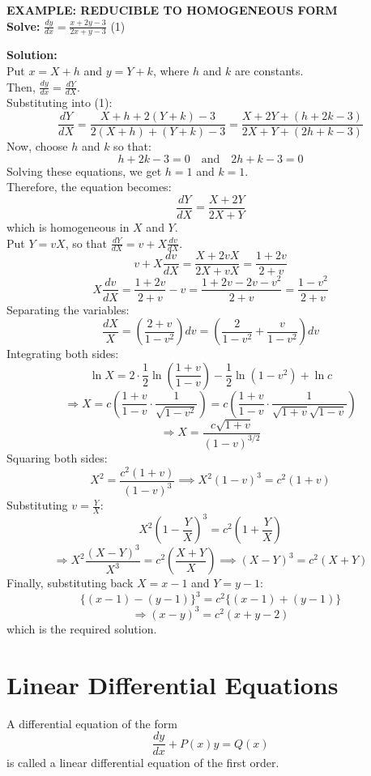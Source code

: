 \documentclass[11pt,a4paper]{article}
\begin{document}
\begin{tcolorbox}[colback=LightBg, colframe=BorderGray, arc=4mm]
    {\small\textbf{\textcolor{AccentBlue}{EXAMPLE: REDUCIBLE TO HOMOGENEOUS FORM}}}
    \vspace{0.2cm}\\
    \textbf{Solve:} $\displaystyle \frac{dy}{dx} = \frac{x+2y-3}{2x+y-3}$ \hfill (1)
    
    \vspace{0.2cm}
    \textbf{Solution:} \\
    Put $x = X+h$ and $y = Y+k$, where $h$ and $k$ are constants. \\
    Then, $\frac{dy}{dx} = \frac{dY}{dX}$. \\
    Substituting into (1):
    \[ \frac{dY}{dX} = \frac{X+h+2(Y+k)-3}{2(X+h)+(Y+k)-3} = \frac{X+2Y + (h+2k-3)}{2X+Y + (2h+k-3)} \]
    Now, choose $h$ and $k$ so that:
    \[ h+2k-3 = 0 \quad \text{and} \quad 2h+k-3 = 0 \]
    Solving these equations, we get $h=1$ and $k=1$. \\
    Therefore, the equation becomes:
    \[ \frac{dY}{dX} = \frac{X+2Y}{2X+Y} \]
    which is homogeneous in $X$ and $Y$. \\
    Put $Y = vX$, so that $\frac{dY}{dX} = v + X\frac{dv}{dX}$.
    \[ v + X\frac{dv}{dX} = \frac{X+2vX}{2X+vX} = \frac{1+2v}{2+v} \]
    \[ X\frac{dv}{dX} = \frac{1+2v}{2+v} - v = \frac{1+2v-2v-v^2}{2+v} = \frac{1-v^2}{2+v} \]
    Separating the variables:
    \[ \frac{dX}{X} = \left(\frac{2+v}{1-v^2}\right)dv = \left(\frac{2}{1-v^2} + \frac{v}{1-v^2}\right)dv \]
    Integrating both sides:
    \[ \ln X = 2 \cdot \frac{1}{2} \ln \left(\frac{1+v}{1-v}\right) - \frac{1}{2} \ln(1-v^2) + \ln c \]
    \[ \Rightarrow X = c \left( \frac{1+v}{1-v} \cdot \frac{1}{\sqrt{1-v^2}} \right) = c \left( \frac{1+v}{1-v} \cdot \frac{1}{\sqrt{1+v}\sqrt{1-v}} \right) \]
    \[ \Rightarrow X = \frac{c\sqrt{1+v}}{(1-v)^{3/2}} \]
    Squaring both sides:
    \[ X^2 = \frac{c^2(1+v)}{(1-v)^3} \implies X^2 (1-v)^3 = c^2 (1+v) \]
    Substituting $v = \frac{Y}{X}$:
    \[ X^2 \left(1 - \frac{Y}{X}\right)^3 = c^2 \left(1 + \frac{Y}{X}\right) \]
    \[ \Rightarrow X^2 \frac{(X-Y)^3}{X^3} = c^2 \left(\frac{X+Y}{X}\right) \implies (X-Y)^3 = c^2(X+Y) \]
    Finally, substituting back $X = x-1$ and $Y = y-1$:
    \[ \{ (x-1) - (y-1) \}^3 = c^2 \{ (x-1) + (y-1) \} \]
    \[ \Rightarrow (x-y)^3 = c^2 (x+y-2) \]
    which is the required solution.
\end{tcolorbox}

\section{Linear Differential Equations}
A differential equation of the form
\[ \frac{dy}{dx} + P(x)y = Q(x) \]
is called a linear differential equation of the first order.
\end{document}
